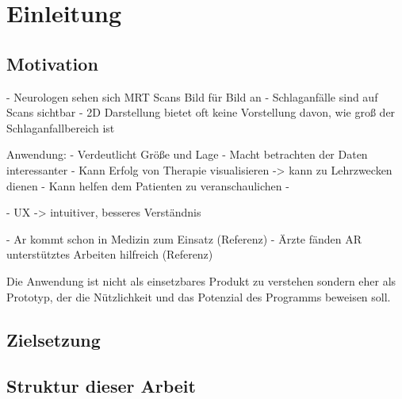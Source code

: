 
\chapter{Einleitung}

\section{Motivation}
- Neurologen sehen sich MRT Scans Bild für Bild an
- Schlaganfälle sind auf Scans sichtbar
- 2D Darstellung bietet oft keine Vorstellung davon, wie groß der Schlaganfallbereich ist


Anwendung:
- Verdeutlicht Größe und Lage
- Macht betrachten der Daten interessanter
- Kann Erfolg von Therapie visualisieren
-> kann zu Lehrzwecken dienen
- Kann helfen dem Patienten zu veranschaulichen
- 

- UX -> intuitiver, besseres Verständnis

- Ar kommt schon in Medizin zum Einsatz (Referenz)
- Ärzte fänden AR unterstütztes Arbeiten hilfreich (Referenz)

Die Anwendung ist nicht als einsetzbares Produkt zu verstehen sondern eher als Prototyp, der die Nützlichkeit und das Potenzial des Programms beweisen soll.

\section{Zielsetzung}

\section{Struktur dieser Arbeit}


